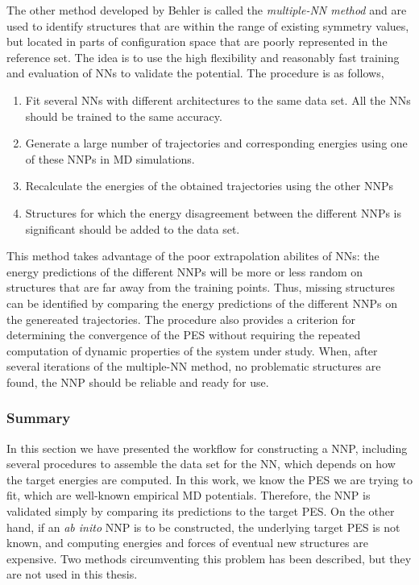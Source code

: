 \documentclass[twoside,english]{uiofysmaster}
\begin{document}
The other method developed by Behler is called the \textit{multiple-NN method} and are used to identify 
structures that are within the range of existing symmetry values, but located
in parts of configuration space that are poorly represented in the reference set.
The idea is to use the high flexibility and reasonably fast training and evaluation of NNs to validate 
the potential. The procedure is as follows,
\begin{enumerate}
 \item Fit several NNs with different architectures to the same data set. All the NNs should be trained
 to the same accuracy. 
 \item Generate a large number of trajectories and corresponding energies using one of these NNPs in MD simulations.
 \item Recalculate the energies of the obtained trajectories using the other NNPs
 \item Structures for which the energy disagreement between the different NNPs is significant should be added to 
 the data set.
\end{enumerate}
This method takes advantage of the poor extrapolation abilites of NNs: the energy predictions of the different NNPs will
be more or less random on structures that are far away from the training points. Thus, missing structures can 
be identified by comparing the energy predictions of the different NNPs on the genereated trajectories. The procedure 
also provides a criterion for determining the convergence of the PES without requiring the repeated computation 
of dynamic properties of the system under study. When, after several iterations of the multiple-NN method,
no problematic structures are found, the NNP should be reliable and ready for use. 

\subsubsection{Summary}
In this section we have presented the workflow for constructing a NNP, including several procedures to 
assemble the data set for the NN, which depends on how the target energies are computed. 
In this work, we know the PES we are trying to fit, which are well-known empirical MD potentials. 
Therefore, the NNP is validated simply by comparing its predictions to the target PES.  
On the other hand, if an \textit{ab inito} NNP is to be constructed, the underlying target PES is not known, 
and computing energies and forces of eventual new structures are expensive. Two methods circumventing
this problem has been described, but they are not used in this thesis. 
\end{document}
